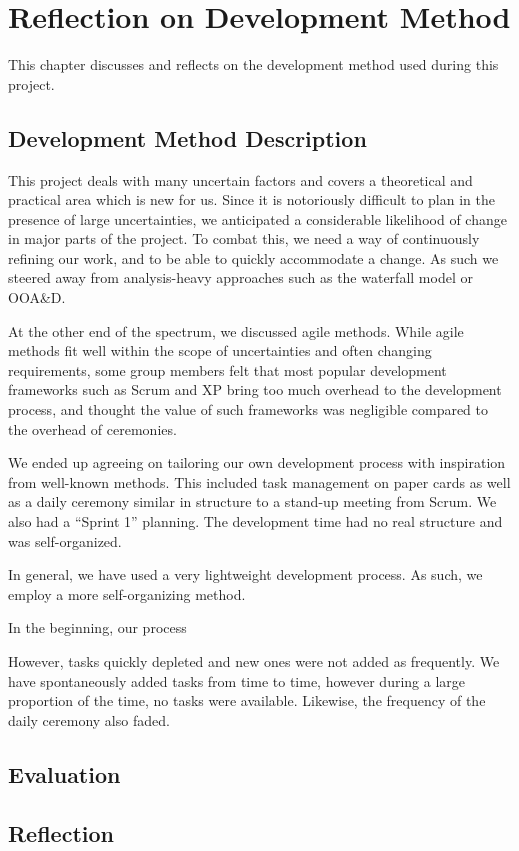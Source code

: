 \chapter{Reflection on Development Method}\label{chap:devmethodreflection}
This chapter discusses and reflects on the development method used during this project.

\section{Development Method Description}
This project deals with many uncertain factors and covers a theoretical and practical area which is new for us. Since it is notoriously difficult to plan in the presence of large uncertainties, we anticipated a considerable likelihood of change in major parts of the project. To combat this, we need a way of continuously refining our work, and to be able to quickly accommodate a change. As such we steered away from analysis-heavy approaches such as the waterfall model or OOA\&D\@.

At the other end of the spectrum, we discussed agile methods. While agile methods fit well within the scope of uncertainties and often changing requirements, some group members felt that most popular development frameworks such as Scrum and XP bring too much overhead to the development process, and thought the value of such frameworks was negligible compared to the overhead of ceremonies.

We ended up agreeing on tailoring our own development process with inspiration from well-known methods. This included task management on paper cards as well as a daily ceremony similar in structure to a stand-up meeting from Scrum. We also had a ``Sprint 1'' planning. The development time had no real structure and was self-organized.

In general, we have used a very lightweight development process. As such, we employ a more self-organizing method.

In the beginning, our process 

However, tasks quickly depleted and new ones were not added as frequently. We have spontaneously added tasks from time to time, however during a large proportion of the time, no tasks were available. Likewise, the frequency of the daily ceremony also faded.

\section{Evaluation}

\section{Reflection}